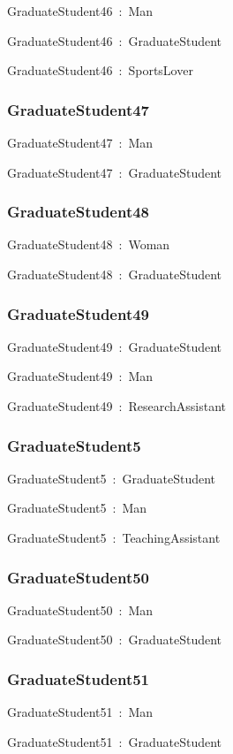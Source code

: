 \documentclass{article}
\begin{document}
GraduateStudent46~:~Man

GraduateStudent46~:~GraduateStudent

GraduateStudent46~:~SportsLover

\subsubsection*{GraduateStudent47}

GraduateStudent47~:~Man

GraduateStudent47~:~GraduateStudent

\subsubsection*{GraduateStudent48}

GraduateStudent48~:~Woman

GraduateStudent48~:~GraduateStudent

\subsubsection*{GraduateStudent49}

GraduateStudent49~:~GraduateStudent

GraduateStudent49~:~Man

GraduateStudent49~:~ResearchAssistant

\subsubsection*{GraduateStudent5}

GraduateStudent5~:~GraduateStudent

GraduateStudent5~:~Man

GraduateStudent5~:~TeachingAssistant

\subsubsection*{GraduateStudent50}

GraduateStudent50~:~Man

GraduateStudent50~:~GraduateStudent

\subsubsection*{GraduateStudent51}

GraduateStudent51~:~Man

GraduateStudent51~:~GraduateStudent
\end{document}
